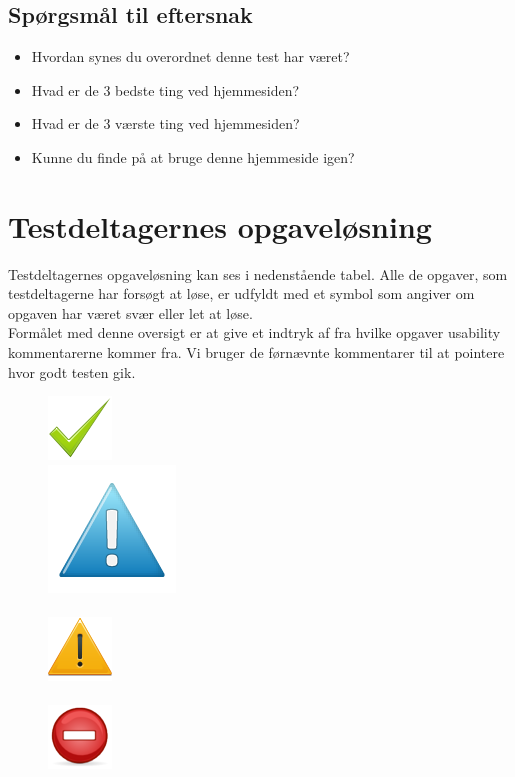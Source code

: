 \documentclass[12pt]{article}
\begin{document}
\subsection{Spørgsmål til eftersnak}
\begin{itemize}
  \item Hvordan synes du overordnet denne test har været?
  \item Hvad er de 3 bedste ting ved hjemmesiden?
  \item Hvad er de 3 værste ting ved hjemmesiden?
  \item Kunne du finde på at bruge denne hjemmeside igen?
\end{itemize}
\newpage
\section{Testdeltagernes opgaveløsning}
Testdeltagernes opgaveløsning kan ses i nedenstående tabel. Alle de opgaver, som testdeltagerne har forsøgt at løse, er udfyldt med et symbol som angiver om opgaven har været svær eller let at løse. \\
\noindent Formålet med denne oversigt er at give et indtryk af fra hvilke opgaver usability kommentarerne kommer fra.
Vi bruger de førnævnte kommentarer til at pointere hvor godt testen gik.\\
 \begin{figure}
  \includegraphics[scale=0.4]{Billeder/godt} \\
  \includegraphics[scale=0.3]{Billeder/mindre}  \\ \\
  \includegraphics[scale=0.5]{Billeder/alvorligt}  \\ \\
    \includegraphics[scale=0.6]{Billeder/kritisk}
\end{figure} \\ \\
\end{document}
